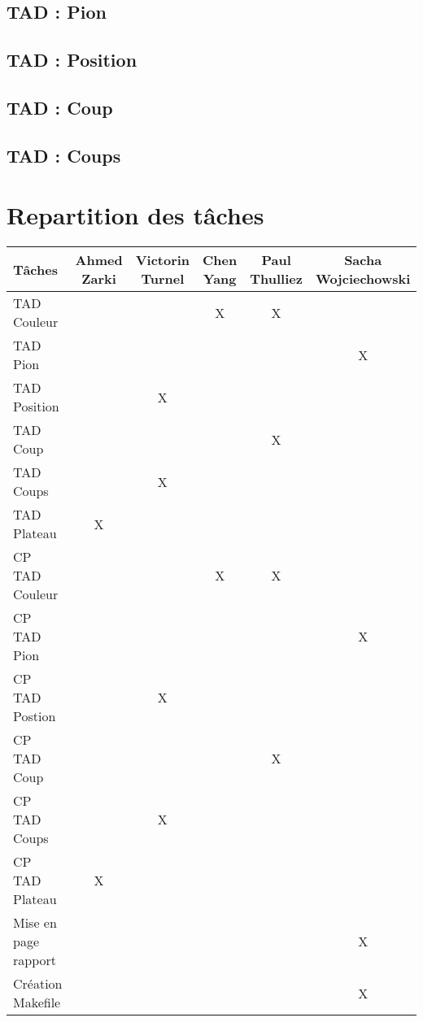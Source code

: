 \documentclass{article}
\begin{document}
\subsection{TAD : Pion}


\subsection{TAD : Position}


\subsection{TAD : Coup}
   

\subsection{TAD : Coups}                                                                              
                                                                      





\section{Repartition des tâches}
\begin{tabular}{|l|c|c|c|c|c|}
  \hline
  Tâches & Ahmed Zarki & Victorin Turnel & Chen Yang & Paul Thulliez & Sacha Wojciechowski \\
  \hline
  TAD Couleur  & & & X & X &   \\
  TAD Pion & & & & & X \\
  TAD Position & & X & & &   \\ 
  TAD Coup & & & & X & \\
  TAD Coups & & X  & & &  \\
  TAD Plateau & X & & & & \\
  CP TAD Couleur & & & X & X & \\
  CP TAD Pion & & & & & X \\
  CP TAD Postion & & X & & &  \\
  CP TAD Coup & & & & X & \\
  CP TAD Coups & & X & & & \\
  CP TAD Plateau & X & & & & \\
  Mise en page rapport & & & & & X \\
  Création Makefile & & & & & X \\
  \hline
\end{tabular}
\end{document}
